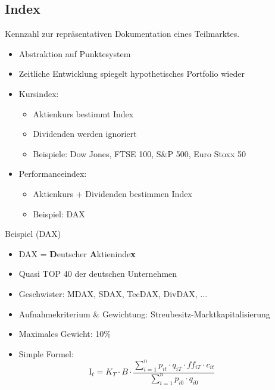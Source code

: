 \documentclass{beamer}
\begin{document}
		\subsection{Index}
		
			\begin{frame}
				\begin{definition}
					Kennzahl zur repräsentativen Dokumentation eines Teilmarktes.
				\end{definition}
			
				\begin{itemize}
					\item Abstraktion auf Punktesystem
					\item Zeitliche Entwicklung spiegelt hypothetisches Portfolio wieder
					\item Kursindex:
					\begin{itemize}
						\item Aktienkurs bestimmt Index
						\item Dividenden werden ignoriert
						\item Beispiele: Dow Jones, FTSE 100, S\&P 500, Euro Stoxx 50
					\end{itemize}
					\item Performanceindex:
					\begin{itemize}
						\item Aktienkurs + Dividenden bestimmen Index
						\item Beispiel: DAX
					\end{itemize}
				\end{itemize}
			\end{frame}
		
			\begin{frame}{Beispiel (DAX)}
				\begin{itemize}
					\item DAX = \textbf{D}eutscher \textbf{A}ktieninde\textbf{x}\citewiki{DAX}
					\item Quasi TOP 40 der deutschen Unternehmen
					\item Geschwister: MDAX, SDAX, TecDAX, DivDAX, ...
					\item Aufnahmekriterium \& Gewichtung: Streubesitz-Marktkapitalisierung
					\item Maximales Gewicht: 10\%
					\item Simple Formel:\pause
					\[
						\text{I}_t = K_T \cdot B \cdot \frac
						{
							\sum_{i=1}^{n} p_{it} \cdot q_{iT} \cdot ff_{iT} \cdot c_{it}
						}
						{
							\sum_{i=1}^{n} p_{i0} \cdot q_{i0}
						}\hspace{1cm}
					\]
				\end{itemize}
			\end{frame}
		
\end{document}
